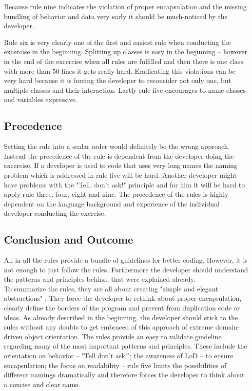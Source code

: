 Because rule nine indicates the violation of proper encapsulation and the missing bundling of behavior and data very early it should be much-noticed by the developer. 

Rule six is very clearly one of the first and easiest rule when conducting the excercise in the beginning. Splitting up classes is easy in the beginning -- however in the end of the excercise when all rules are fulfilled and then there is one class with more than 50 lines it gets really hard. Eradicating this violations can be very hard because it is forcing the developer to reconsider not only one, but multiple classes and their interaction. 
Lastly rule five encourages to name classes and variables expressive. 

\subsection*{Precedence}
Setting the rule into a scalar order would definitely be the wrong approach. Instead the precedence of the rule is dependent from the developer doing the excercise. If a developer is used to code that uses very long names the naming problem which is addressed in rule five will be hard. Another developer might have problems with the "Tell, don't ask!" \cite{telldontaskoriginal} principle and for him it will be hard to apply rule three, four, eight and nine. The precedence of the rules is highly dependent on the language background and experience of the individual developer conducting the exercise. 

\subsection*{Conclusion and Outcome}
All in all the rules provide a bundle of guidelines for better coding. However, it is not enough to just follow the rules. Furthermore the developer should understand the patterns and principles behind, that were explained already. 
\\

To summarize the rules, they are all about creating "simple and elegant abstractions" \cite[p. 80]{oc2008}. They force the developer to rethink about proper encapsulation, clearly define the borders of the program and prevent from duplication code or ideas. As already described in the beginning, the developer should stick to the rules without any doubts to get embraced of this approach of extreme domain-driven object orientation. The rules provide an easy to validate guideline regarding many of the most important patterns and principles. These include the orientation on behavior -- "Tell don't ask!"; the awareness of \ac{LoD} -- to ensure encapsulation; the focus on readability -- rule five limits the possibilities of different namings dramatically and therefore forces the developer to think about a concise and clear name. 
\\

